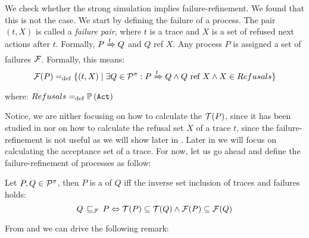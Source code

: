 We check whether the strong simulation implies failure-refinement. We found that this is not the case. We start by defining the failure of a process.
The pair $(t, X)$ is called a \textit{failure pair}, where $t$ is a trace and $X$ is a set of refused next actions after $t$. Formally, $P \xRightarrow{t} Q$ and $Q$ ref $X$. Any process
$P$ is assigned a set of failures $\Failures[]$. Formally, this means:
\begin{align}
    \Failures[P] \define \{(t,X) \mid \exists Q\in\procs: P \bigstep{t} Q \wedge Q \text{ ref } X \wedge X\in Refusals\}
\end{align}
where: $Refusals =_{\mathrm{def}} \mathbb P\left(\mathtt{Act}\right)$

Notice, we are nither focusing on how to calculate the $\Traces[P]$, since it has been studied in \cite{gieseking} nor on how to calculate the refusal set $X$ of a trace $t$, since the failure-refinement is not useful as we will show later in . Later in  we will focus on calculating the acceptance set of a trace.
For now, let us go ahead and define the failure-refinement of \picalc{} processes as follow:

\begin{definition}
\label{def_failure_ref}
	Let $P,Q\in\mathcal P^{\pi}$, then $P$ is a  of $Q$ iff the inverse set inclusion of traces and failures holds:
   \[Q \refiF P \Leftrightarrow  \Traces[P]\subseteq\Traces[Q] \wedge \Failures[P]\subseteq\Failures[Q]\]
\end{definition}

From  and  we can drive the following remark: 

